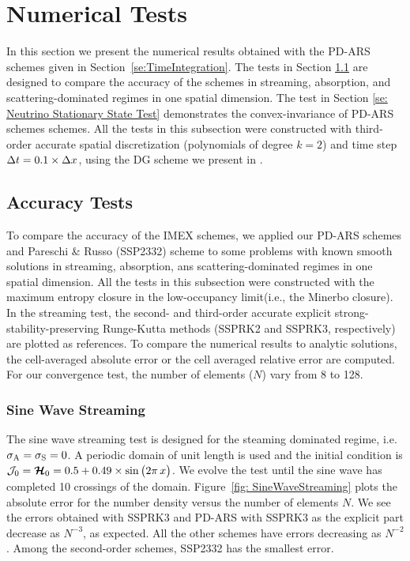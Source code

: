 \section{Numerical Tests}\label{se:NumericalTests}

In this section we present the numerical results obtained with the PD-ARS schemes given in Section~\ref{se:TimeIntegration}.
The tests in Section \ref{se: Accuracy Tests} are designed to compare the accuracy of the schemes in streaming, absorption, and scattering-dominated regimes in one spatial dimension.
The test in Section \ref{se: Neutrino Stationary State Test} demonstrates the convex-invariance of PD-ARS schemes schemes.
All the tests in this subsection were constructed with third-order accurate spatial discretization (polynomials of degree $k=2$) and time step $\Delta t = 0.1 \times \Delta x $, using the DG scheme we present in \cite{chu_etal_2018}.

\subsection{Accuracy Tests}
\label{se: Accuracy Tests}
To compare the accuracy of the IMEX schemes, we applied our PD-ARS schemes and Pareschi \& Russo \cite{pareschiRusso_2005} (SSP2332) scheme to some problems with known smooth solutions in streaming, absorption, ans scattering-dominated regimes in one spatial dimension.
All the tests in this subsection were constructed with the maximum entropy closure in the low-occupancy limit(i.e., the Minerbo closure).
In the streaming test, the second- and third-order accurate explicit strong-stability-preserving Runge-Kutta methods\cite{gottlieb_etal_2001} (SSPRK2 and SSPRK3, respectively) are plotted as references.
To compare the numerical results to analytic solutions, the cell-averaged absolute error or the cell averaged relative error are computed.
For our convergence test, the number of elements ($N$) vary from 8 to 128.

\subsubsection{Sine Wave Streaming}
The sine wave streaming test is designed for the steaming dominated regime, i.e. $\sigma_{{\rm A}} = \sigma_{{\rm S}} = 0$.
A periodic domain of unit length is used and the initial condition is $\mathcal{J}_{0} = \boldsymbol{\mathcal{H}}_{0} = 0.5+0.49\times\sin\big(2\pi\,x\big)$.
We evolve the test until the sine wave has completed 10 crossings of the domain.
Figure~\ref{fig: SineWaveStreaming} plots the absolute error for the number density versus the number of elements $N$.
We see the errors obtained with SSPRK3 and PD-ARS with SSPRK3 as the explicit part decrease as $N^{-3}$, as expected.
All the other schemes have errors decreasing as $N^{-2}$.
Among the second-order schemes, SSP2332 has the smallest error.

